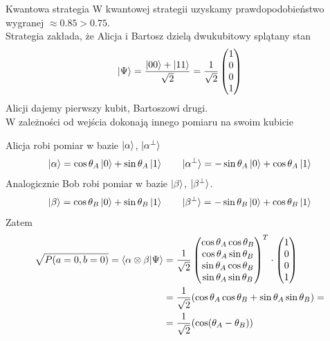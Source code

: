 \begin{frame}{Kwantowa strategia}
W kwantowej strategii uzyskamy prawdopodobieństwo wygranej \(\approx 0.85 > 0.75\).\\
Strategia zakłada, że Alicja i Bartosz dzielą dwukubitowy splątany stan
\[\ket{\Psi}=\frac{\ket{00}+\ket{{11}}}{\sqrt{2}}=\frac{1}{\sqrt{2}}\begin{pmatrix}
    1 \\0 \\0 \\1
\end{pmatrix}\]
 Alicji dajemy pierwszy kubit, Bartoszowi drugi.\\
 W zależności od wejścia dokonają innego pomiaru na swoim kubicie
\end{frame}




\begin{frame}{}
    Alicja robi pomiar w bazie \(\ket{\alpha}\), \(\ket{\alpha^\perp}\)
    \vspace{-0.7em}
    \[\ket{\alpha}=\cos \theta_A \ket{0} + \sin \theta_A \ket{1}  \qquad \ket{\alpha^\perp}=-\sin \theta_A \ket{0} + \cos \theta_A \ket{1} \]
    Analogicznie Bob robi pomiar w bazie \(\ket{\beta}\), \(\ket{\beta^\perp}\).
    \vspace{-0.7em}
    \[\ket{\beta}=\cos \theta_B \ket{0} + \sin \theta_B \ket{1}  \qquad \ket{\beta^\perp}=-\sin \theta_B \ket{0} + \cos \theta_B \ket{1} \]
    Zatem
    \vspace{-3em}
    \begin{align*}
\sqrt{P(a=0, b=0)}=\braket{\alpha \otimes \beta | \Psi}
&=\frac{1}{\sqrt{2}}
\begin{pmatrix}
\cos \theta_A \cos \theta_B \\
\cos \theta_A \sin \theta_B \\
\sin \theta_A \cos \theta_B \\
\sin \theta_A \sin \theta_B
\end{pmatrix}^T \cdot
\begin{pmatrix}
1 \\
0 \\
0 \\
1
\end{pmatrix}
\\&=\frac{1}{\sqrt{2}}(\cos \theta_A \cos \theta_B+\sin \theta_A \sin \theta_B)=
\\&=\frac{1}{\sqrt{2}}(\cos(\theta_A-\theta_B))
\end{align*}
\end{frame}


